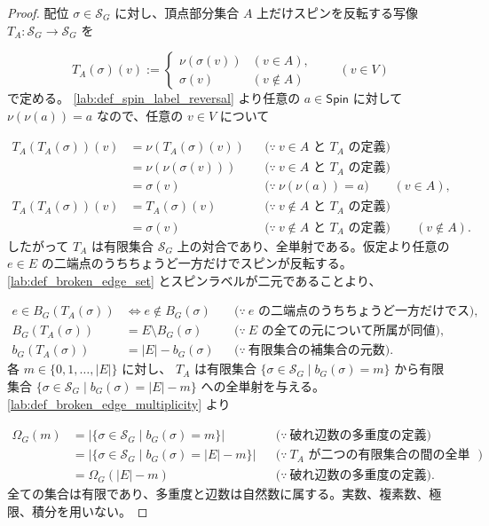 \documentclass[11pt,a4paper]{article}
\theoremstyle{remark}
\begin{document}
\begin{proof}
配位 
$\sigma\in\mathcal S_G$
 に対し、頂点部分集合 
$A$
 上だけスピンを反転する写像 
$T_A:\mathcal S_G\to\mathcal S_G$
 を

\[T_A(\sigma)(v):=
\begin{cases}
  \nu(\sigma(v)) & (v\in A),\\
  \sigma(v) & (v\notin A)
\end{cases}
\qquad(v\in V)\]
で定める。
\cref{lab:def_spin_label_reversal}
 より任意の 
$a\in\mathsf{Spin}$
 に対して 
$\nu(\nu(a))=a$
 なので、任意の 
$v\in V$
 について

\[\begin{aligned}
T_A(T_A(\sigma))(v)
&=\nu(T_A(\sigma)(v))
&&\bigl(\because\ v\in A\text{ と }T_A\text{ の定義}\bigr)\\
&=\nu(\nu(\sigma(v)))
&&\bigl(\because\ v\in A\text{ と }T_A\text{ の定義}\bigr)\\
&=\sigma(v)
&&\bigl(\because\ \nu(\nu(a))=a\bigr)
\qquad(v\in A),\\[4pt]
T_A(T_A(\sigma))(v)
&=T_A(\sigma)(v)
&&\bigl(\because\ v\notin A\text{ と }T_A\text{ の定義}\bigr)\\
&=\sigma(v)
&&\bigl(\because\ v\notin A\text{ と }T_A\text{ の定義}\bigr)
\qquad(v\notin A).
\end{aligned}\]
したがって 
$T_A$
 は有限集合 
$\mathcal S_G$
 上の対合であり、全単射である。仮定より任意の 
$e\in E$
 の二端点のうちちょうど一方だけでスピンが反転する。
\cref{lab:def_broken_edge_set}
 とスピンラベルが二元であることより、

\[\begin{aligned}
e\in B_G(T_A(\sigma))
&\iff e\notin B_G(\sigma)
&&\bigl(\because\ e\text{ の二端点のうちちょうど一方だけでスピンを反転する}\bigr),\\
B_G(T_A(\sigma))
&=E\setminus B_G(\sigma)
&&\bigl(\because\ E\text{ の全ての元について所属が同値}\bigr),\\
b_G(T_A(\sigma))
&=|E|-b_G(\sigma)
&&\bigl(\because\ \text{有限集合の補集合の元数}\bigr).
\end{aligned}\]
各 
$m\in\{0,1,\ldots,|E|\}$
 に対し、
$T_A$
 は有限集合 
$\{\sigma\in\mathcal S_G\mid b_G(\sigma)=m\}$
 から有限集合 
$\{\sigma\in\mathcal S_G\mid b_G(\sigma)=|E|-m\}$
 への全単射を与える。
\cref{lab:def_broken_edge_multiplicity}
 より

\[\begin{aligned}
\Omega_G(m)
&=\left|\{\sigma\in\mathcal S_G\mid b_G(\sigma)=m\}\right|
&&\bigl(\because\ \text{破れ辺数の多重度の定義}\bigr)\\
&=\left|\{\sigma\in\mathcal S_G\mid b_G(\sigma)=|E|-m\}\right|
&&\bigl(\because\ T_A\text{ が二つの有限集合の間の全単射}\bigr)\\
&=\Omega_G(|E|-m)
&&\bigl(\because\ \text{破れ辺数の多重度の定義}\bigr).
\end{aligned}\]
全ての集合は有限であり、多重度と辺数は自然数に属する。実数、複素数、極限、積分を用いない。

\end{proof}
\end{document}

